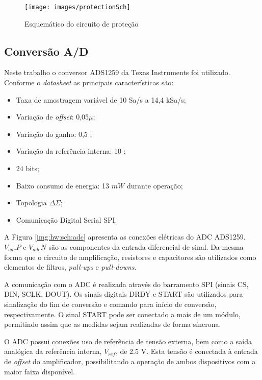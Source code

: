 				\begin{figure}[h]
					\caption{Esquemático do circuito de proteção}
					\label{img:hw:sch:protection}
					\centering
					\texttt{[image: images/protectionSch]}
				\end{figure}


			\subsection{Conversão A/D}\label{sec:hw:sch:digital}

				Neste trabalho o conversor ADS1259 da Texas Instruments\textsuperscript{\textregistered} foi utilizado. Conforme o \textit{datasheet} as principais características são:

				\begin{itemize}
					\item Taxa de amostragem variável de 10 Sa/s a 14,4 kSa/s;
					\item Variação de \textit{offset}: 0,05$\mu$;
					\item Variação do ganho: 0,5 ;
					\item Variação da referência interna: 10 ;
					\item 24 bits;
					\item Baixo consumo de energia: 13 $mW$ durante operação;
					\item Topologia $\Delta\Sigma$;
					\item Comunicação Digital Serial SPI.
				\end{itemize}

				A Figura \ref{img:hw:sch:adc} apresenta as conexões elétricas do ADC ADS1259. $V_{adc}P$ e $V_{adc}N$ são as componentes da entrada diferencial de sinal. Da mesma forma que o circuito de amplificação, resistores e capacitores são utilizados como elementos de filtros, \textit{pull-ups} e \textit{pull-downs}.

				A comunicação com o ADC é realizada através do barramento SPI (sinais CS, DIN, SCLK, DOUT). Os sinais digitais DRDY e START são utilizados para sinalização do fim de conversão e comando para início de conversão, respectivamente. O sinal START pode ser conectado a mais de um módulo, permitindo assim que as medidas sejam realizadas de forma síncrona.

				O ADC possui conexões uso de referência de tensão externa, bem como a saída analógica da referência interna, $V_{ref}$, de 2.5 V. Esta tensão é conectada à entrada de \textit{offset} do amplificador, possibilitando a operação de ambos dispositivos com a maior faixa disponível.


